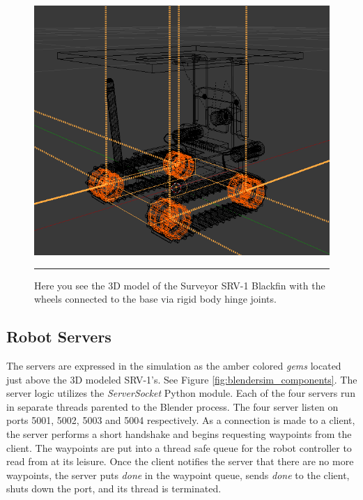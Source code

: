 \begin{figure}[htbp]
\centering
\includegraphics[scale=0.5]{../Figures/Chapter5/srv1.png}
\rule{35em}{0.5pt}
\caption[SRV-1 3D Model]{Here you see the 3D model of the Surveyor SRV-1 Blackfin with the wheels connected to the base via rigid body hinge joints.}
\label{fig:srv1_3d_model}
\end{figure}

\subsection{Robot Servers}


The servers are expressed in the simulation as the amber colored \textit{gems} located just above the 3D modeled SRV-1's. See Figure \ref{fig:blendersim_components}. The server logic utilizes the \textit{ServerSocket} Python module. Each of the four servers run in separate threads parented to the Blender process. The four server listen on ports 5001, 5002, 5003 and 5004 respectively. As a connection is made to a client, the server performs a short handshake and begins requesting waypoints from the client. The waypoints are put into a thread safe queue for the robot controller to read from at its leisure. Once the client notifies the server that there are no more waypoints, the server puts \textit{done} in the waypoint queue, sends \textit{done} to the client, shuts down the port, and its thread is terminated.

